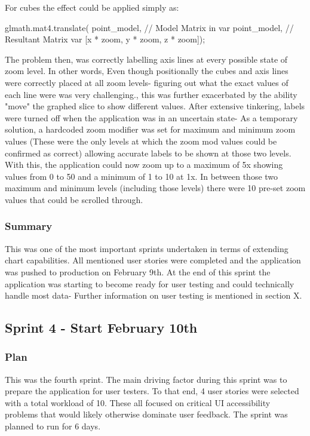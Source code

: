 For cubes the effect could be applied simply as:
\begin{code}
    glmath.mat4.translate(
    point_model, // Model Matrix in var
    point_model, // Resultant Matrix var
        [x * zoom, y * zoom, z * zoom]);
\end{code}

The problem then, was correctly labelling axis lines at every possible state of zoom level. In other words, Even though positionally the cubes and axis lines were correctly placed at all zoom levels- figuring out what the exact values of each line were was very challenging., this was further exacerbated by the ability "move" the graphed slice to show different values. After extensive tinkering, labels were turned off when the application was in an uncertain state- As a temporary solution, a hardcoded zoom modifier was set for maximum and minimum zoom values (These were the only levels at which the zoom mod values could be confirmed as correct) allowing accurate labels to be shown at those two levels.
With this, the application could now zoom up to a maximum of 5x showing values from 0 to 50 and a minimum of 1 to 10 at 1x. In between those two maximum and minimum levels (including those levels) there were 10 pre-set zoom values that could be scrolled through.

\subsubsection{Summary}
This was one of the most important sprints undertaken in terms of extending chart capabilities. All mentioned user stories were completed and the application was pushed to production on February 9th. At the end of this sprint the application was starting to become ready for user testing and could technically handle most data- Further information on user testing is mentioned in section X.

\subsection{Sprint 4 - Start February 10th}
\subsubsection{Plan}
This was the fourth sprint. The main driving factor during this sprint was to prepare the application for user testers. To that end, 4 user stories were selected with a total workload of 10. These all focused on critical UI accessibility problems that would likely otherwise dominate user feedback. The sprint was planned to run for 6 days.

